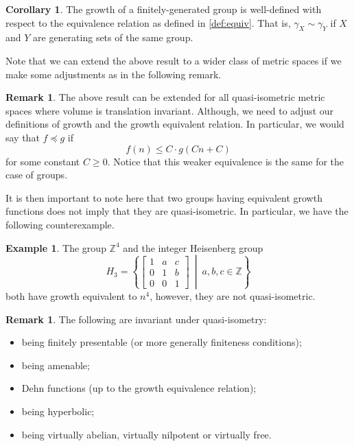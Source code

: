 \documentclass[11pt,a4paper,reqno]{amsart}
\theoremstyle{plain}
\theoremstyle{definition}
\newtheorem{corollary}{Corollary}[theorem]
\theoremstyle{definition}
\newtheorem{example}[theorem]{Example}
\newtheorem{remark}[theorem]{Remark}
\renewcommand\leq\leqslant
\renewcommand\geq\geqslant
\begin{document}
\begin{corollary}
	The growth of a finitely-generated group is well-defined with respect to the equivalence relation as defined in \cref{def:equiv}.
	That is, $\gamma_X \sim \gamma_Y$ if $X$ and $Y$ are generating sets of the same group.
\end{corollary}

Note that we can extend the above result to a wider class of metric spaces if we make some adjustments as in the following remark.

\begin{remark}
	The above result can be extended for all quasi-isometric metric spaces where volume is translation invariant.
	Although, we need to adjust our definitions of growth and the growth equivalent relation.
	In particular, we would say that $f \preccurlyeq g$ if
	\[
		f(n) \leq C \cdot g(Cn+C)
	\]
	for some constant $C \geq 0$.
	Notice that this weaker equivalence is the same for the case of groups.
\end{remark}

It is then important to note here that two groups having equivalent growth functions does not imply that they are quasi-isometric.
In particular, we have the following counterexample.

\begin{example}
	The group $\mathbb{Z}^4$ and the integer Heisenberg group
	\[
		H_3
		=
		\left\{
			\begin{bmatrix}
				1 & a & c\\
				0 & 1 & b\\
				0 & 0 & 1
			\end{bmatrix}
		\ \middle\vert\ 
			a,b,c\in \mathbb{Z}
		\right\}
	\]
	both have growth equivalent to $n^4$, however, they are not quasi-isometric.
\end{example}

\begin{remark}
	The following are invariant under quasi-isometry:
	\begin{itemize}
		\item being finitely presentable (or more generally finiteness conditions);
		\item being amenable;
		\item Dehn functions (up to the growth equivalence relation);
		\item being hyperbolic;
		\item being virtually abelian, virtually nilpotent or virtually free.
	\end{itemize}
\end{remark}
\end{document}

